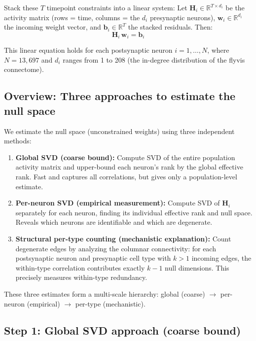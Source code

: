 \documentclass[11pt,a4paper]{article}
\begin{document}
Stack these $T$ timepoint constraints into a linear system: Let $\mathbf{H}_i \in \mathbb{R}^{T \times d_i}$ be the activity matrix (rows = time, columns = the $d_i$ presynaptic neurons), $\mathbf{w}_i \in \mathbb{R}^{d_i}$ the incoming weight vector, and $\mathbf{b}_i \in \mathbb{R}^T$ the stacked residuals. Then:
\begin{equation}
\mathbf{H}_i\, \mathbf{w}_i = \mathbf{b}_i
\end{equation}

This linear equation holds for each postsynaptic neuron $i = 1, \ldots, N$, where $N = 13{,}697$ and $d_i$ ranges from 1 to 208 (the in-degree distribution of the flyvis connectome).

\subsection{Overview: Three approaches to estimate the null space}

We estimate the null space (unconstrained weights) using three independent methods:

\begin{enumerate}
\item \textbf{Global SVD (coarse bound):} Compute SVD of the entire population activity matrix and upper-bound each neuron's rank by the global effective rank. Fast and captures all correlations, but gives only a population-level estimate.
\item \textbf{Per-neuron SVD (empirical measurement):} Compute SVD of $\mathbf{H}_i$ separately for each neuron, finding its individual effective rank and null space. Reveals which neurons are identifiable and which are degenerate.
\item \textbf{Structural per-type counting (mechanistic explanation):} Count degenerate edges by analyzing the columnar connectivity: for each postsynaptic neuron and presynaptic cell type with $k > 1$ incoming edges, the within-type correlation contributes exactly $k - 1$ null dimensions. This precisely measures within-type redundancy.
\end{enumerate}

These three estimates form a multi-scale hierarchy: global (coarse) $\to$ per-neuron (empirical) $\to$ per-type (mechanistic).

\subsection{Step 1: Global SVD approach (coarse bound)}
\end{document}
